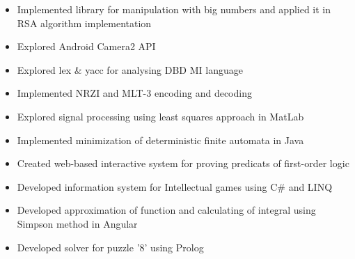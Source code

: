 \documentclass[letterpaper]{twentysecondcv} %
\begin{document}
\begin{itemize}
        {}
    \item \projectItem
        {Implemented library for manipulation with big numbers and applied it in RSA algorithm implementation}
        {}
    \item \projectItem
        {Explored Android Camera2 API }
        {}
    \item \projectItem
        {Explored lex \& yacc for analysing DBD MI language }
        {}
    \item \projectItem
        {Implemented NRZI and MLT-3 encoding and decoding }
        {}
    \item \projectItem
        {Explored signal processing using least squares approach in MatLab}
        {}
    \item \projectItem
        {Implemented minimization of deterministic finite automata in Java}
        {}
    \item \projectItem
        {Created web-based interactive system for proving predicats of first-order logic}
        {}
    \item \projectItem
        {Developed information system for Intellectual games using C\# and LINQ }
        {}
    \item \projectItem
        {Developed approximation of function and calculating of integral using Simpson method in Angular }
        {}
    \item \projectItem
        {Developed solver for puzzle '8' using Prolog}
        {}
\end{itemize}
\end{document}
